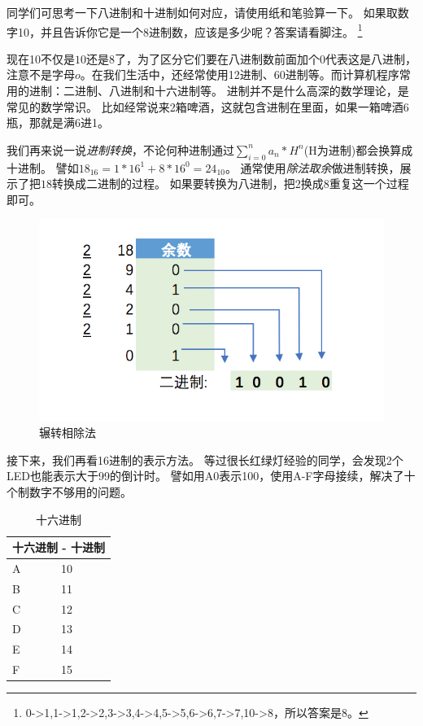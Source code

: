 同学们可思考一下八进制和十进制如何对应，请使用纸和笔验算一下。
如果取数字10，并且告诉你它是一个8进制数，应该是多少呢？答案请看脚注。
\footnote{0->1,1->1,2->2,3->3,4->4,5->5,6->6,7->7,10->8，所以答案是8。}

现在10不仅是$10$还是$8$了，为了区分它们要在八进制数前面加个$0$代表这是八进制，注意不是字母$o$。在我们生活中，还经常使用12进制、60进制等。而计算机程序常用的进制：二进制、八进制和十六进制等。
进制并不是什么高深的数学理论，是常见的数学常识。
比如经常说来2箱啤酒，这就包含进制在里面，如果一箱啤酒6瓶，那就是满6进1。

我们再来说一说\emph{进制转换}，不论何种进制通过$\sum_{i=0}^n a_n*H^n$(H为进制)都会换算成十进制。
譬如$18_{16} = 1*16^1+8*16^0 = 24_{10}$。
通常使用\emph{除法取余}做进制转换，展示了把$18$转换成二进制的过程。
如果要转换为八进制，把2换成8重复这一个过程即可。

\begin{figure}[!htb]
\centerline{\includegraphics[width=.3\figwidth]{images/eu_alg.png}}
\caption{辗转相除法}
\label{fig:part1_eu_alg}
\end{figure}

接下来，我们再看16进制的表示方法。
等过很长红绿灯经验的同学，会发现2个LED也能表示大于99的倒计时。
譬如用A0表示100，使用A-F字母接续，解决了十个制数字不够用的问题。

\begin{table}[!htbp]\centering
\begin{tabular}{|p{5cm}|p{5cm}|}
\hline
\multicolumn{2}{|c|}{十六进制 - 十进制}\\
\hline
A&10\\B&11\\C&12\\D&13\\E&14\\F&15\\
\hline
\end{tabular}
\caption{十六进制}
\label{table:part1_hex_to_dec}
\end{table}

